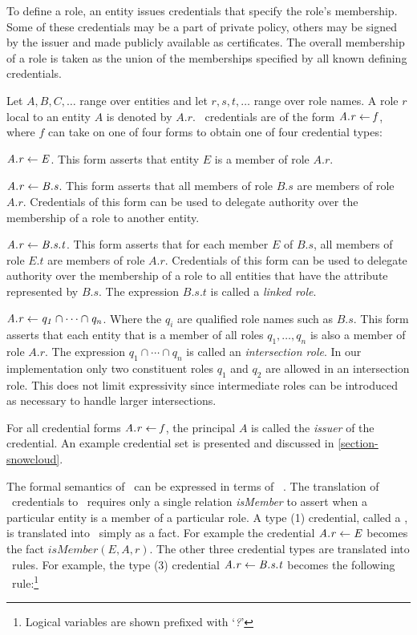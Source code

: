 To define a role, an entity issues credentials that specify the role's
membership. Some of these credentials may be a part of private policy,
others may be signed by the issuer and made publicly available as
certificates. The overall membership of a role is taken as the union of
the memberships specified by all known defining credentials.

Let $A, B, C, \ldots$ range over entities and let $r, s, t, \ldots$
range over role names. A role $r$ local to an entity $A$ is denoted by
$A.r$. \RT\ credentials are of the form $\mathit{A.r} \leftarrow \mathit{f}$, where $f$ can
take on one of four forms to obtain one of four credential types:
\begin{longenum}

\item $\mathit{A.r} \leftarrow \mathit{E}$. This form asserts that entity $E$ is a member of
  role $A.r$.

\item $\mathit{A.r} \leftarrow \mathit{B.s}$. This form asserts that all members of role
  $B.s$ are members of role $A.r$. Credentials of this form can be used
  to delegate authority over the membership of a role to another entity.

\item $\mathit{A.r} \leftarrow \mathit{B.s.t}$. This form asserts that for each member $E$ of
  $B.s$, all members of role $E.t$ are members of role $A.r$.
  Credentials of this form can be used to delegate authority over the
  membership of a role to all entities that have the attribute
  represented by $B.s$. The expression $B.s.t$ is called a \emph{linked
    role}.

\item $\mathit{A.r} \leftarrow \mathit{q_1 \cap \cdots \cap q_n}$. Where the $q_i$ are
  qualified role names such as $B.s$. This form asserts that each entity
  that is a member of all roles $q_1,\ldots, q_n$ is also a member of
  role $A.r$. The expression $q_1 \cap \cdots \cap q_n$ is called an
  \emph{intersection role}. In our implementation only two constituent
  roles $q_1$ and $q_2$ are allowed in an intersection role. This does
  not limit expressivity since intermediate roles can be introduced as
  necessary to handle larger intersections.

\end{longenum}
For all credential forms $\mathit{A.r} \leftarrow \mathit{f}$, the principal $A$ is called
the \emph{issuer} of the credential. An example credential set is
presented and discussed in \autoref{section-snowcloud}.

The formal semantics of \RT\ can be expressed in terms of \datalog\
\cite{Li:DRBTMF}. The translation of \RT\ credentials to \datalog\
requires only a single relation \textit{isMember} to assert when a
particular entity is a member of a particular role. A type (1)
credential, called a \newterm{membership credential}, is translated into
\datalog\ simply as a fact. For example the credential $\mathit{A.r} \leftarrow \mathit{E}$
becomes the fact $\textit{isMember}(E, A, r)$. The other three
credential types are translated into \datalog\ rules. For example, the
type (3) credential $\mathit{A.r} \leftarrow \mathit{B.s.t}$ becomes the following \datalog\
rule:\footnote{Logical variables are shown prefixed with `\textit{?}'}

